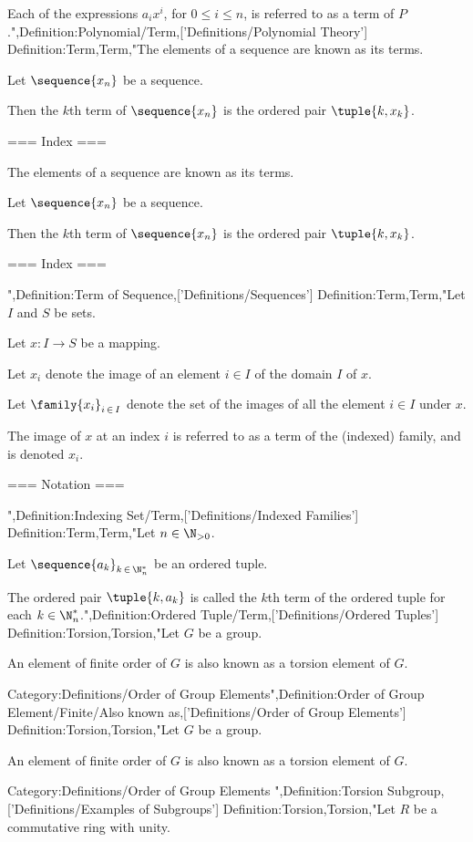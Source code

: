 Each of the expressions $a_i x^i$, for $0 \le i \le n$, is referred to as a term of $P$.",Definition:Polynomial/Term,['Definitions/Polynomial Theory']
Definition:Term,Term,"The elements of a sequence are known as its terms.


Let $\sequence {x_n}$ be a sequence.

Then the $k$th term of $\sequence {x_n}$ is the ordered pair $\tuple {k, x_k}$.


=== Index ===

The elements of a sequence are known as its terms.


Let $\sequence {x_n}$ be a sequence.

Then the $k$th term of $\sequence {x_n}$ is the ordered pair $\tuple {k, x_k}$.


=== Index ===

",Definition:Term of Sequence,['Definitions/Sequences']
Definition:Term,Term,"Let $I$ and $S$ be sets.

Let $x: I \to S$ be a mapping.

Let $x_i$ denote the image of an element $i \in I$ of the domain $I$ of $x$.

Let $\family {x_i}_{i \mathop \in I}$ denote the set of the images of all the element $i \in I$ under $x$.


The image of $x$ at an index $i$ is referred to as a term of the (indexed) family, and is denoted $x_i$.


=== Notation ===

",Definition:Indexing Set/Term,['Definitions/Indexed Families']
Definition:Term,Term,"Let $n \in \N_{>0}$.

Let $\sequence {a_k}_{k \mathop \in \N^*_n}$ be an ordered tuple.

The ordered pair $\tuple {k, a_k}$ is called the $k$th term of the ordered tuple for each $k \in \N^*_n$.",Definition:Ordered Tuple/Term,['Definitions/Ordered Tuples']
Definition:Torsion,Torsion,"Let $G$ be a group.


An element of finite order of $G$ is also known as a torsion element of $G$.


Category:Definitions/Order of Group Elements",Definition:Order of Group Element/Finite/Also known as,['Definitions/Order of Group Elements']
Definition:Torsion,Torsion,"Let $G$ be a group.


An element of finite order of $G$ is also known as a torsion element of $G$.


Category:Definitions/Order of Group Elements
",Definition:Torsion Subgroup,['Definitions/Examples of Subgroups']
Definition:Torsion,Torsion,"Let $R$ be a commutative ring with unity.

